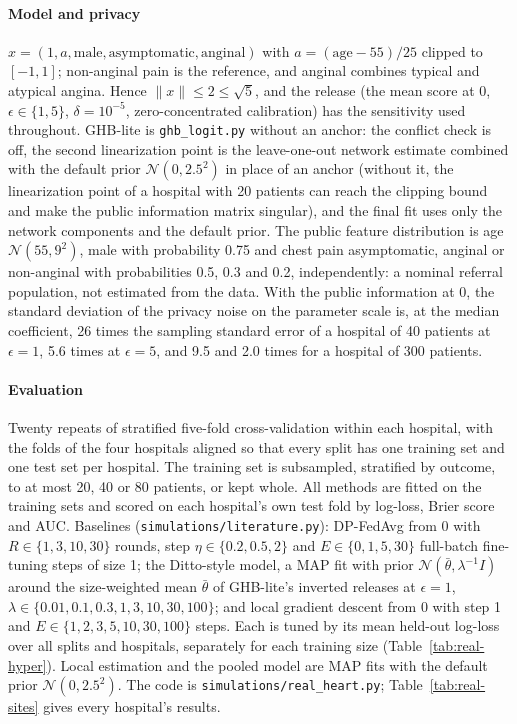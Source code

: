 \documentclass[acmsmall,screen,nonacm]{acmart}
\theoremstyle{acmdefinition}
\begin{document}
\paragraph{Model and privacy} $x=(1,a,\text{male},\text{asymptomatic},\text{anginal})$ with $a=(\text{age}-55)/25$ clipped to $[-1,1]$; non-anginal pain is the reference, and anginal combines typical and atypical angina. Hence $\|x\|\le 2\le\sqrt{5}$, and the release (the mean score at 0, $\epsilon\in\{1,5\}$, $\delta=10^{-5}$, zero-concentrated calibration) has the sensitivity used throughout. GHB-lite is \texttt{ghb\_logit.py} without an anchor: the conflict check is off, the second linearization point is the leave-one-out network estimate combined with the default prior $\mathcal{N}(0,2.5^2)$ in place of an anchor (without it, the linearization point of a hospital with 20 patients can reach the clipping bound and make the public information matrix singular), and the final fit uses only the network components and the default prior. The public feature distribution is age $\mathcal{N}(55,9^2)$, male with probability 0.75 and chest pain asymptomatic, anginal or non-anginal with probabilities 0.5, 0.3 and 0.2, independently: a nominal referral population, not estimated from the data. With the public information at 0, the standard deviation of the privacy noise on the parameter scale is, at the median coefficient, 26 times the sampling standard error of a hospital of 40 patients at $\epsilon=1$, 5.6 times at $\epsilon=5$, and 9.5 and 2.0 times for a hospital of 300 patients.

\paragraph{Evaluation} Twenty repeats of stratified five-fold cross-validation within each hospital, with the folds of the four hospitals aligned so that every split has one training set and one test set per hospital. The training set is subsampled, stratified by outcome, to at most 20, 40 or 80 patients, or kept whole. All methods are fitted on the training sets and scored on each hospital's own test fold by log-loss, Brier score and AUC. Baselines (\texttt{simulations/literature.py}): DP-FedAvg \cite{mcmahan2018learning} from 0 with $R\in\{1,3,10,30\}$ rounds, step $\eta\in\{0.2,0.5,2\}$ and $E\in\{0,1,5,30\}$ full-batch fine-tuning steps of size 1; the Ditto-style \cite{li2021ditto} model, a MAP fit with prior $\mathcal{N}(\bar\theta,\lambda^{-1}I)$ around the size-weighted mean $\bar\theta$ of GHB-lite's inverted releases at $\epsilon=1$, $\lambda\in\{0.01,0.1,0.3,1,3,10,30,100\}$; and local gradient descent from 0 with step 1 and $E\in\{1,2,3,5,10,30,100\}$ steps. Each is tuned by its mean held-out log-loss over all splits and hospitals, separately for each training size (Table~\ref{tab:real-hyper}). Local estimation and the pooled model are MAP fits with the default prior $\mathcal{N}(0,2.5^2)$. The code is \texttt{simulations/real\_heart.py}; Table~\ref{tab:real-sites} gives every hospital's results.
\end{document}
